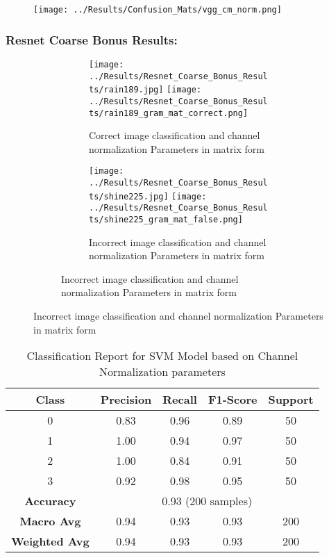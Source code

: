 \documentclass{article}
\begin{document}
\begin{figure}[H]
    \centering
    \texttt{[image: ../Results/Confusion\_Mats/vgg\_cm\_norm.png]}
\end{figure}


\subsubsection{Resnet Coarse Bonus Results:}
\begin{figure}[H]
    \centering
    \begin{subfigure}{\linewidth}
        \centering
        \begin{subfigure}{0.49\linewidth}
            \centering
            \texttt{[image: ../Results/Resnet\_Coarse\_Bonus\_Results/rain189.jpg]}
            \texttt{[image: ../Results/Resnet\_Coarse\_Bonus\_Results/rain189\_gram\_mat\_correct.png]}
            \caption*{Correct image classification and channel normalization Parameters in matrix form}
        \end{subfigure}
        \begin{subfigure}{0.49\linewidth}
            \centering
            \texttt{[image: ../Results/Resnet\_Coarse\_Bonus\_Results/shine225.jpg]}
            \texttt{[image: ../Results/Resnet\_Coarse\_Bonus\_Results/shine225\_gram\_mat\_false.png]}
            \caption*{Incorrect image classification and channel normalization Parameters in matrix form}
        \end{subfigure}
    \end{subfigure}
\end{figure}

\begin{table}[h!]
    \centering
    \begin{tabular}{|c|c|c|c|c|}
        \hline
        Class & Precision & Recall & F1-Score & Support \\
        \hline
        0 & 0.83 & 0.96 & 0.89 & 50 \\
        1 & 1.00 & 0.94 & 0.97 & 50 \\
        2 & 1.00 & 0.84 & 0.91 & 50 \\
        3 & 0.92 & 0.98 & 0.95 & 50 \\
        \hline
        \multicolumn{1}{|c|}{\textbf{Accuracy}} & \multicolumn{4}{c|}{0.93 (200 samples)} \\
        \hline
        \multicolumn{1}{|c|}{\textbf{Macro Avg}} & 0.94 & 0.93 & 0.93 & 200 \\
        \multicolumn{1}{|c|}{\textbf{Weighted Avg}} & 0.94 & 0.93 & 0.93 & 200 \\
        \hline
    \end{tabular}
    \caption{Classification Report for SVM Model based on Channel Normalization parameters}
\end{table}
\end{document}
